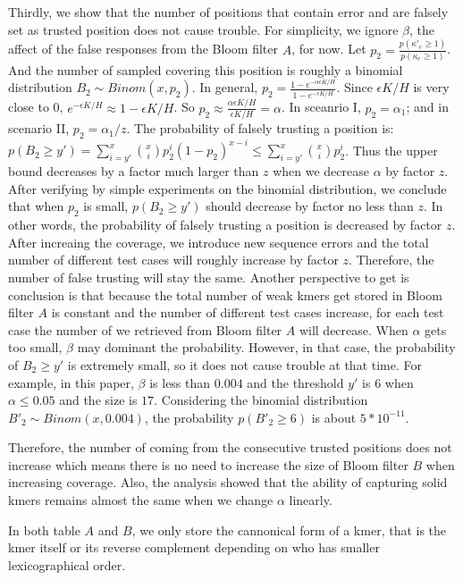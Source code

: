 \documentclass[10pt]{article}
\begin{document}
Thirdly, we show that the number of positions that contain error and are falsely set as trusted position does not cause trouble. For simplicity, we ignore $\beta$, the affect of the false responses from the Bloom filter $A$, for now. Let $p_2=\frac{p(\kappa'_e\ge 1)}{p(\kappa_e\ge 1)}$. And the number of sampled \kmers covering this position is roughly a binomial distribution $B_2\sim Binom(x, p_2)$. In general, $p_2=\frac{1-e^{-\alpha\epsilon K/H}}{1-e^{-\epsilon K/H}}$. Since $\epsilon K/H$ is very close to 0, $e^{-\epsilon K/H}\approx 1-\epsilon K/H$. So $p_2\approx \frac{\alpha \epsilon K/H}{\epsilon K/H}=\alpha$. In sceanrio I, $p_2=\alpha_1$; and in scenario II, $p_2=\alpha_1/z$. The probability of falsely trusting a position is: 
$p(B_2\geq y')=\sum_{i=y'}^x \binom{x}{i} p_2^i(1-p_2)^{x-i} \leq \sum_{i=y'}^x \binom{x}{i} p_2^i$. Thus the upper bound decreases by a factor much larger than $z$ when we decrease $\alpha$ by factor $z$. After verifying by simple experiments on the binomial distribution, we conclude that when $p_2$ is small, $p(B_2\ge y')$ should decrease by factor no less than $z$. In other words, the probability of falsely trusting a position is decreased by factor $z$. After increaing the coverage, we introduce new sequence errors and the total number of different test cases will roughly increase by factor $z$. Therefore, the number of false trusting will stay the same. Another perspective to get is conclusion is that because the total number of weak kmers get stored in Bloom filter $A$ is constant and the number of different test cases increase, for each test case the number of \kmers we retrieved from Bloom filter $A$ will decrease. When $\alpha$ gets too small, $\beta$ may dominant the probability. However, in that case, the probability of $B_2\ge y'$ is extremely small, so it does not cause trouble at that time. For example, in this paper, $\beta$ is less than $0.004$ and the threshold $y'$ is 6 when $\alpha\le 0.05$ and the \kmer size is $17$. Considering the binomial distribution $B'_2\sim Binom(x, 0.004)$, the probability $p(B'_2\ge 6)$ is about $5*10^{-11}$. 

Therefore, the number of \kmers coming from the consecutive trusted positions does not increase which means there is no need to increase the size of Bloom filter $B$ when increasing coverage. Also, the analysis showed that the ability of capturing solid kmers remains almost the same when we change $\alpha$ linearly. 

In both table $A$ and $B$, we only store the cannonical form of a kmer, that is the kmer itself or its reverse complement depending on who has smaller lexicographical order. 
\end{document}
